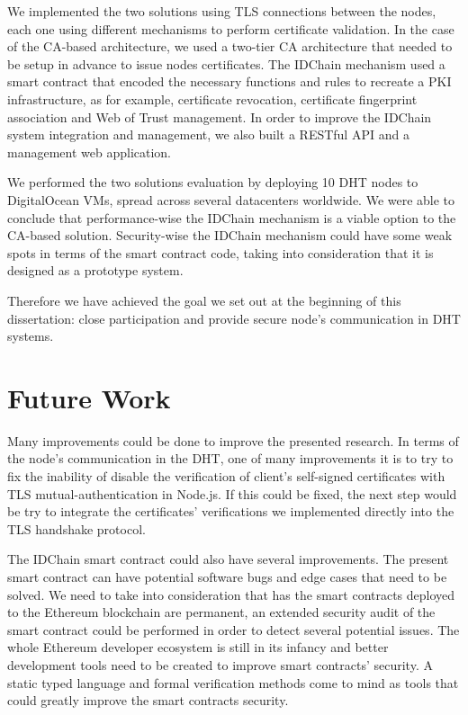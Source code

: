 We implemented the two solutions using TLS connections between the nodes, each one using different mechanisms to perform certificate validation.
In the case of the CA-based architecture, we used a two-tier CA architecture that needed to be setup in advance to issue nodes certificates.
The IDChain mechanism used a smart contract that encoded the necessary functions and rules to recreate a \ac{PKI} infrastructure, as for example, certificate revocation, certificate fingerprint association and Web of Trust management.
In order to improve the IDChain system integration and management, we also built a RESTful API and a management web application.

We performed the two solutions evaluation by deploying 10 DHT nodes to DigitalOcean \acp{VM}, spread across several datacenters worldwide.
We were able to conclude that performance-wise the IDChain mechanism is a viable option to the CA-based solution.
Security-wise the IDChain mechanism could have some weak spots in terms of the smart contract code, taking into consideration that it is designed as a prototype system.

Therefore we have achieved the goal we set out at the beginning of this dissertation: close participation and provide secure node's communication in DHT systems.

\section{Future Work}
\label{section:future}

Many improvements could be done to improve the presented research.
In terms of the node's communication in the DHT, one of many improvements it is to try to fix the inability of disable the verification of client's self-signed certificates with TLS mutual-authentication in Node.js.
If this could be fixed, the next step would be try to integrate the certificates' verifications we implemented directly into the TLS handshake protocol.

The IDChain smart contract could also have several improvements.
The present smart contract can have potential software bugs and edge cases that need to be solved.
We need to take into consideration that has the smart contracts deployed to the Ethereum blockchain are permanent, an extended security audit of the smart contract could be performed in order to detect several potential issues.
The whole Ethereum developer ecosystem is still in its infancy and better development tools need to be created to improve smart contracts' security.
A static typed language and formal verification methods come to mind as tools that could greatly improve the smart contracts security.

